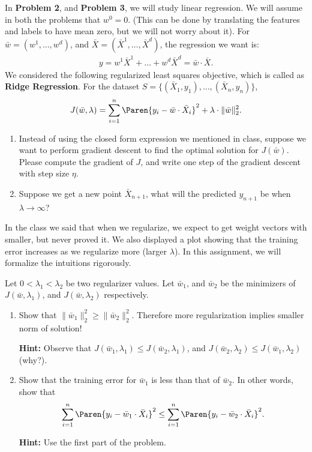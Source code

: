 \documentclass[11pt]{article}
\newenvironment{problem}[2][Problem]{\begin{trivlist}
\item[\hskip \labelsep {\bfseries #1}\hskip \labelsep {\bfseries #2.}]}{\end{trivlist}}
\begin{document}
\noindent In \textbf{Problem 2}, and \textbf{Problem 3}, we will study linear regression. We will assume in both the problems that $w^0=0$. (This can be done by translating the features and labels to have mean zero, but we will not worry about it).  For $\bar w = (w^1, \ldots, w^d)$, and $\bar X = (\bar X^1, \ldots, \bar X^d)$, the regression we want is:
\begin{align}
y = w^1 \bar X^1+\ldots + w^d \bar X^d = \bar w\cdot \bar X.
\end{align}
We considered the following regularized least squares objective, which is called as \textbf{Ridge Regression}. For the dataset $S=\{(\bar X_1, y_1), \ldots, (\bar X_n, y_n)\}$,  
\[
J(\bar w, \lambda) = \sum_{i=1}^n \Paren{y_i -\bar w\cdot \bar X_i}^2 +\lambda \cdot \|\bar w\|_2^2.
\]	
 
\begin{problem}{2 (10 points) Gradient Descent for regression}\quad

\begin{enumerate}
\item 
Instead of using the closed form expression we mentioned in class, suppose we want to perform gradient descent to find the optimal solution for $J(\bar w)$. Please compute the gradient of $J$, and write one step of the gradient descent with step size $\eta$. 
\item
Suppose we get a new point $\bar X_{n+1}$, what will the predicted $y_{n+1}$ be when $\lambda\to\infty$? 
\end{enumerate}
\end{problem}


\begin{problem}{3 (15 points) Regularization increases training error}
In the class we said that when we regularize, we expect to get weight vectors with smaller, but never proved it. We also displayed a plot showing that the training error increases as we regularize more (larger $\lambda$). In this assignment, we will formalize the intuitions rigorously.

Let $0<\lambda_1<\lambda_2$ be two regularizer values. Let $\bar w_1$, and $\bar w_2$ be the minimizers of $J(\bar w, \lambda_1)$, and $J(\bar w, \lambda_2)$ respectively. 

\begin{enumerate}
	\item Show that $\|\bar w_1\|_2^2\ge \|\bar w_2\|_2^2$. Therefore more regularization implies smaller norm of solution!
	
	\textbf{Hint:} Observe that $J(\bar w_1, \lambda_1)\le J(\bar w_2, \lambda_1)$, and $J(\bar w_2, \lambda_2)\le J(\bar w_1, \lambda_2)$ (why?). 
	\item Show that the training error for $\bar w_1$ is less than that of $\bar w_2$. In other words, show that 
\[
\sum_{i=1}^n \Paren{y_i -\bar w_1\cdot \bar X_i}^2 \le \sum_{i=1}^n \Paren{y_i -\bar w_2\cdot \bar X_i}^2.
\]

\textbf{Hint:} Use the first part of the problem.
\end{enumerate}

\end{problem}
\end{document}
